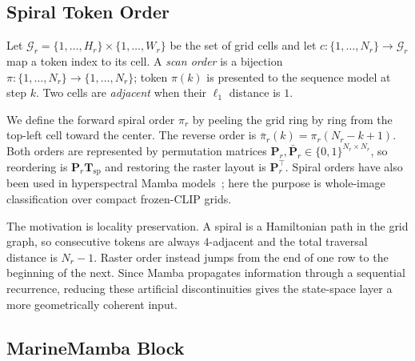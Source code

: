\documentclass[runningheads]{llncs}
\begin{document}
\subsection{Spiral Token Order}
\label{sec:method-spiral}

Let $\mathcal{G}_r = \{1,\dots,H_r\}\times\{1,\dots,W_r\}$ be the set of grid cells and let $c:\{1,\dots,N_r\}\to\mathcal{G}_r$ map a token index to its cell. A \emph{scan order} is a bijection $\pi:\{1,\dots,N_r\}\to\{1,\dots,N_r\}$; token $\pi(k)$ is presented to the sequence model at step $k$. Two cells are \emph{adjacent} when their $\ell_1$ distance is $1$.

We define the forward spiral order $\pi_r$ by peeling the grid ring by ring from the top-left cell toward the center. The reverse order is $\bar{\pi}_r(k)=\pi_r(N_r-k+1)$. Both orders are represented by permutation matrices $\mathbf{P}_r,\bar{\mathbf{P}}_r\in\{0,1\}^{N_r\times N_r}$, so reordering is $\mathbf{P}_r\mathbf{T}_{\mathrm{sp}}$ and restoring the raster layout is $\mathbf{P}_r^{\top}$. Spiral orders have also been used in hyperspectral Mamba models~\cite{spiralmamba,lsfmamba}; here the purpose is whole-image classification over compact frozen-CLIP grids.

The motivation is locality preservation. A spiral is a Hamiltonian path in the grid graph, so consecutive tokens are always $4$-adjacent and the total traversal distance is $N_r-1$. Raster order instead jumps from the end of one row to the beginning of the next. Since Mamba propagates information through a sequential recurrence, reducing these artificial discontinuities gives the state-space layer a more geometrically coherent input.

\subsection{MarineMamba Block}
\label{sec:method-block}
\end{document}
